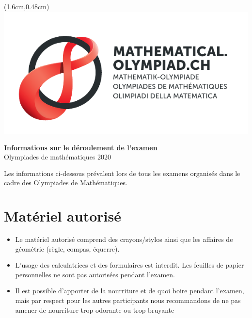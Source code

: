 \documentclass[12pt,a4paper]{article}
\begin{document}
\thispagestyle{empty}

\begin{textblock*}{\paperwidth}(1.6cm,0.48cm) %
\includegraphics[scale=0.67]{Logo_Mathematik_CMYK.pdf}
\end{textblock*}

\vspace*{2cm}

\begin{center}
\Huge{\textbf{Informations sur le déroulement de l'examen}}\\
\large{Olympiades de mathématiques 2020}
\end{center}

\bigskip

Les informations ci-dessous prévalent lors de tous les examens organisés dans le cadre des Olympiades de Mathématiques.

\section{Matériel autorisé}
\begin{itemize}
	\item Le matériel autorisé comprend des crayons/stylos ainsi que les affaires de géométrie (règle, compas, équerre).
	
	\item L'usage des calculatrices et des formulaires est interdit. Les feuilles de papier personnelles ne sont pas autorisées pendant l'examen.
	
	\item Il est possible d'apporter de la nourriture et de quoi boire pendant l'examen, mais par respect pour les autres participants nous recommandons de ne pas amener de nourriture trop odorante ou trop bruyante
\end{itemize}
\end{document}
